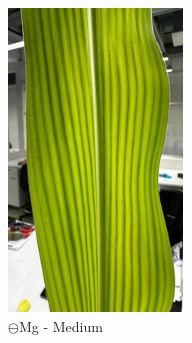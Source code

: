 \documentclass[10pt,a4paper]{article}
\begin{document}
\begin{figure}[H]
\begin{subfigure}[b]{0.31\textwidth}
				\includegraphics[width=\textwidth]{MinusMg_.jpg}
				\caption{$\ominus$Mg - Medium}
				\label{fig:minus mg_}
			\end{subfigure}
			\hfill
			\begin{subfigure}[b]{0.235\textwidth}

\end{subfigure}
\end{figure}
\end{document}
